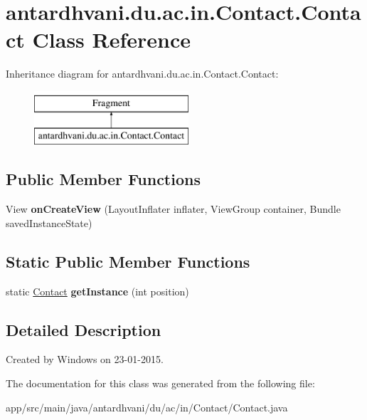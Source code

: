 \hypertarget{classantardhvani_1_1du_1_1ac_1_1in_1_1_contact_1_1_contact}{}\section{antardhvani.\+du.\+ac.\+in.\+Contact.\+Contact Class Reference}
\label{classantardhvani_1_1du_1_1ac_1_1in_1_1_contact_1_1_contact}
Inheritance diagram for antardhvani.\+du.\+ac.\+in.\+Contact.\+Contact\+:\begin{figure}[H]
\begin{center}
\leavevmode
\includegraphics[height=2.000000cm]{classantardhvani_1_1du_1_1ac_1_1in_1_1_contact_1_1_contact}
\end{center}
\end{figure}
\subsection*{Public Member Functions}
\begin{DoxyCompactItemize}
\item 
\hypertarget{classantardhvani_1_1du_1_1ac_1_1in_1_1_contact_1_1_contact_a3f6ed57683c86d6022ae29fd9f7ca4c1}{}View {\bfseries on\+Create\+View} (Layout\+Inflater inflater, View\+Group container, Bundle saved\+Instance\+State)\label{classantardhvani_1_1du_1_1ac_1_1in_1_1_contact_1_1_contact_a3f6ed57683c86d6022ae29fd9f7ca4c1}

\end{DoxyCompactItemize}
\subsection*{Static Public Member Functions}
\begin{DoxyCompactItemize}
\item 
\hypertarget{classantardhvani_1_1du_1_1ac_1_1in_1_1_contact_1_1_contact_a967365a0fd48a8e484e2ae71e93dd44a}{}static \hyperlink{classantardhvani_1_1du_1_1ac_1_1in_1_1_contact_1_1_contact}{Contact} {\bfseries get\+Instance} (int position)\label{classantardhvani_1_1du_1_1ac_1_1in_1_1_contact_1_1_contact_a967365a0fd48a8e484e2ae71e93dd44a}

\end{DoxyCompactItemize}


\subsection{Detailed Description}
Created by Windows on 23-\/01-\/2015. 

The documentation for this class was generated from the following file\+:\begin{DoxyCompactItemize}
\item 
app/src/main/java/antardhvani/du/ac/in/\+Contact/Contact.\+java\end{DoxyCompactItemize}
